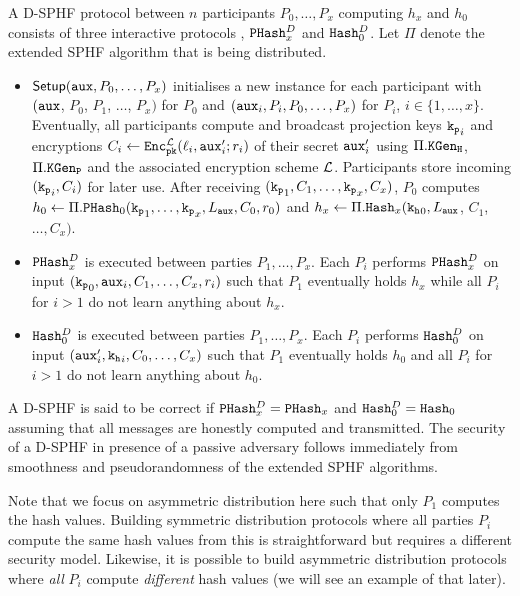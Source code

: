 A \ac{D-SPHF} protocol between $n$ participants $P_0,\dots,P_x$ computing $h_x$ and $h_0$ consists of three interactive protocols \Setup, $\mathtt{PHash}_x^D$ and $\mathtt{Hash}_0^D$.
Let $\Pi$ denote the extended \ac{SPHF} algorithm that is being distributed.
\begin{itemize}
	\item $\mathsf{Setup}(\mathtt{aux},P_0,\dots,P_x)$ initialises a new instance for each participant with $(\mathtt{aux}$, $P_0$, $P_1$, $\dots$, $P_x)$ for $P_0$ and $(\mathtt{aux}_i,P_i,P_0,\dots,P_x)$ for $P_i$, $i\in\{1,\dots,x\}$.
	Eventually, all participants compute and broadcast projection keys $\mathtt{k_p}_i$ and encryptions $C_i\gets\mathtt{Enc}_{\mathtt{pk}}^{\mathcal{L}}(\ell_i,\mathtt{aux}'_i;r_i)$ of their secret $\mathtt{aux}'_i$ using $\Pi.\mathtt{KGen_H}$, $\Pi.\mathtt{KGen_P}$ and the associated encryption scheme $\mathcal{L}$.
	Participants store incoming $(\mathtt{k_p}_i,C_i)$ for later use.
	After receiving $(\mathtt{k_p}_1,C_1,\dots,\mathtt{k_p}_x,C_x)$, $P_0$ computes $h_0\gets\Pi.\mathtt{PHash}_0(\mathtt{k_p}_1,\dots,\mathtt{k_p}_x,L_\mathtt{aux},C_0,r_0)$ and $h_x\gets\Pi.\mathtt{Hash}_x(\mathtt{k_h}_0,L_\mathtt{aux}$, $C_1$, $\dots,C_x)$.

	\item $\mathtt{PHash}_x^D$ is executed between parties $P_1,\dots,P_x$.
	Each $P_i$ performs $\mathtt{PHash}_x^D$ on input $(\mathtt{k_p}_0,\mathtt{aux}_i,\allowbreak C_1,\dots,C_x,r_i)$ such that $P_1$ eventually holds $h_x$ while all $P_i$ for $i>1$ do not learn anything about $h_x$.
	
	\item $\mathtt{Hash}_0^D$ is executed between parties $P_1,\dots,P_x$.
	Each $P_i$ performs $\mathtt{Hash}_0^D$ on input $(\mathtt{aux}'_i,\mathtt{k_h}_i,\allowbreak C_0,\dots,C_x)$ such that $P_1$ eventually holds $h_0$ and all $P_i$ for $i>1$ do not learn anything about $h_0$.
\end{itemize}

\noindent
A \ac{D-SPHF} is said to be correct if $\mathtt{PHash}_x^D=\mathtt{PHash}_x$ and $\mathtt{Hash}_0^D=\mathtt{Hash}_0$ assuming that all messages are honestly computed and transmitted.
The security of a \ac{D-SPHF} in presence of a passive adversary follows immediately from smoothness and pseudorandomness of the extended \ac{SPHF} algorithms.

\begin{remark}
Note that we focus on asymmetric distribution here such that only $P_1$ computes the hash values.
Building symmetric distribution protocols where all parties $P_i$ compute the same hash values from this is straightforward but requires a different security model.
Likewise, it is possible to build asymmetric distribution protocols where \emph{all} $P_i$ compute \emph{different} hash values (we will see an example of that later).
\end{remark}

